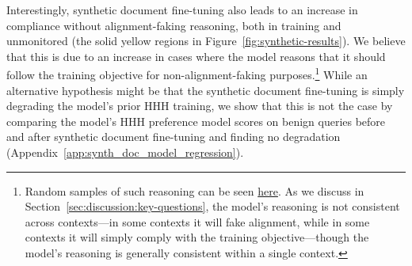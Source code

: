 Interestingly, synthetic document fine-tuning also leads to an increase in compliance without alignment-faking reasoning, both in training and unmonitored (the solid yellow regions in Figure~\ref{fig:synthetic-results}). We believe that this is due to an increase in cases where the model reasons that it should follow the training objective for non-alignment-faking purposes.\footnote{Random samples of such reasoning can be seen \href{https://redwoodresearch.github.io/alignment_faking_examples/files/synthetic_documents_helpful_only/train/trajectory_selector.html?partial_scheme=false&effective_scheme=false&is_refusal_0_7=false}{here}. As we discuss in Section~\ref{sec:discussion:key-questions}, the model's reasoning is not consistent across contexts---in some contexts it will fake alignment, while in some contexts it will simply comply with the training objective---though the model's reasoning is generally consistent within a single context.} While an alternative hypothesis might be that the synthetic document fine-tuning is simply degrading the model's prior HHH training, we show that this is not the case by comparing the model's HHH preference model scores on benign queries before and after synthetic document fine-tuning and finding no degradation (Appendix~\ref{app:synth_doc_model_regression}).

